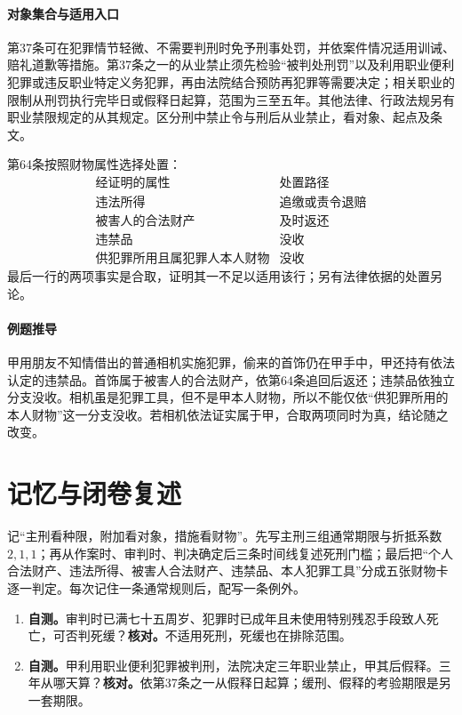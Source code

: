 \paragraph{对象集合与适用入口}
第37条可在犯罪情节轻微、不需要判刑时免予刑事处罚，并依案件情况适用训诫、赔礼道歉等措施。第37条之一的从业禁止须先检验“被判处刑罚”以及利用职业便利犯罪或违反职业特定义务犯罪，再由法院结合预防再犯罪等需要决定；相关职业的限制从刑罚执行完毕日或假释日起算，范围为三至五年。其他法律、行政法规另有职业禁限规定的从其规定。区分刑中禁止令与刑后从业禁止，看对象、起点及条文。

第64条按照财物属性选择处置：
\[
\begin{array}{l|l}
\text{经证明的属性} & \text{处置路径}\\ \hline
\text{违法所得} & \text{追缴或责令退赔}\\
\text{被害人的合法财产} & \text{及时返还}\\
\text{违禁品} & \text{没收}\\
\text{供犯罪所用且属犯罪人本人财物} & \text{没收}
\end{array}
\]
最后一行的两项事实是合取，证明其一不足以适用该行；另有法律依据的处置另论。

\paragraph{例题推导}
甲用朋友不知情借出的普通相机实施犯罪，偷来的首饰仍在甲手中，甲还持有依法认定的违禁品。首饰属于被害人的合法财产，依第64条追回后返还；违禁品依独立分支没收。相机虽是犯罪工具，但不是甲本人财物，所以不能仅依“供犯罪所用的本人财物”这一分支没收。若相机依法证实属于甲，合取两项同时为真，结论随之改变。

\section*{记忆与闭卷复述}
记“主刑看种限，附加看对象，措施看财物”。先写主刑三组通常期限与折抵系数 \(2,1,1\)；再从作案时、审判时、判决确定后三条时间线复述死刑门槛；最后把“个人合法财产、违法所得、被害人合法财产、违禁品、本人犯罪工具”分成五张财物卡逐一判定。每次记住一条通常规则后，配写一条例外。
\begin{enumerate}
 \item \textbf{自测。}审判时已满七十五周岁、犯罪时已成年且未使用特别残忍手段致人死亡，可否判死缓？\quad\textbf{核对。}不适用死刑，死缓也在排除范围。
 \item \textbf{自测。}甲利用职业便利犯罪被判刑，法院决定三年职业禁止，甲其后假释。三年从哪天算？\quad\textbf{核对。}依第37条之一从假释日起算；缓刑、假释的考验期限是另一套期限。
\end{enumerate}
